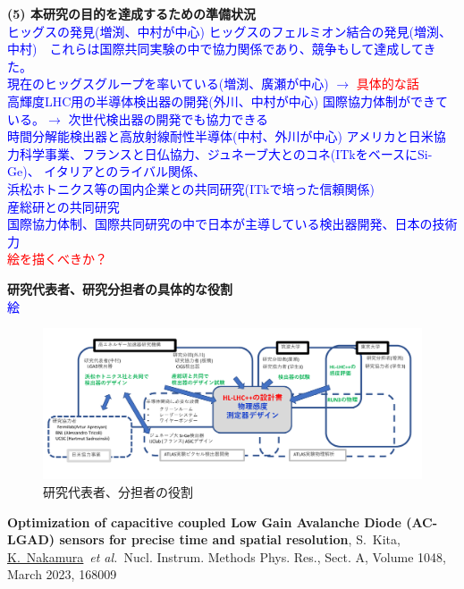 \documentclass[11pt,a4j,dvipdfmx]{jarticle} 					%
\newcommand{\研究課題名}{新型半導体検出器を用いた真空の解明}
\newcommand{\研究機関名}{高エネルギー加速器研究機構}
\newcommand{\研究代表者氏名}{中村浩二}
\newcommand{\me}{\underline{\underline{K.~Nakamura}}}
\newcommand{\研究期間の最終元号年度}{10}  %
\newcommand{\TODO}[1]{\textcolor{red}{#1}}
\newcommand{\MEMO}[1]{\textcolor{blue}{#1}}
\newcommand{\etal}{\textit{et al.\ }}
\begin{document}
\noindent\colorbox[gray]{0.9}{\textbf{(5) 本研究の目的を達成するための準備状況}}\\
\MEMO{
ヒッグスの発見(増渕、中村が中心) ヒッグスのフェルミオン結合の発見(増渕、中村)　これらは国際共同実験の中で協力関係であり、競争もして達成してきた。\\
現在のヒッグスグループを率いている(増渕、廣瀬が中心) $\to$ \TODO{具体的な話}\\
高輝度LHC用の半導体検出器の開発(外川、中村が中心) 国際協力体制ができている。$\to$ 次世代検出器の開発でも協力できる\\
時間分解能検出器と高放射線耐性半導体(中村、外川が中心) アメリカと日米協力科学事業、フランスと日仏協力、ジュネーブ大とのコネ(ITkをベースにSi-Ge)、 イタリアとのライバル関係、\\
浜松ホトニクス等の国内企業との共同研究(ITkで培った信頼関係)\\
産総研との共同研究\\
国際協力体制、国際共同研究の中で日本が主導している検出器開発、日本の技術力\\
\TODO{絵を描くべきか？}
}

\noindent\colorbox[gray]{0.9}{\textbf{研究代表者、研究分担者の具体的な役割}}\\
\MEMO{
絵
}


\begin{figure}[h]
\vspace{0cm}
 \begin{center}
  \includegraphics[width=\textwidth]{./figs/taisei.pdf}
  \vspace{-1.5cm}
  \caption{研究代表者、分担者の役割\label{fig:taisei}}
\vspace{3cm}
 \end{center}
\end{figure}


\begin{thebibliography}{99}
 {\bf Optimization of capacitive coupled Low Gain Avalanche Diode (AC-LGAD) sensors for precise time and spatial resolution}, S.~Kita, \me ~\etal  Nucl. Instrum. Methods Phys. Res., Sect. A,  Volume 1048, March 2023, 168009
\end{thebibliography}
\end{document}
